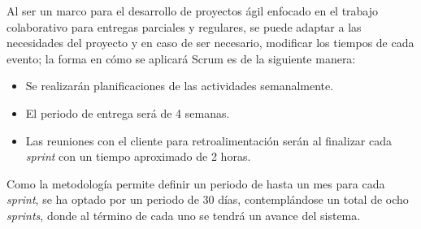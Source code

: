 Al ser un marco para el desarrollo de proyectos ágil enfocado en el trabajo colaborativo para entregas parciales y regulares, se puede adaptar a las necesidades del proyecto y en caso de ser necesario, modificar los tiempos de cada  evento; la forma en cómo se aplicará Scrum es de la siguiente manera:
\begin{itemize}
	\item Se realizarán planificaciones de las actividades semanalmente.
	\item El periodo de entrega será de 4 semanas.
	\item Las reuniones con el cliente para retroalimentación serán al finalizar cada \textit{sprint} con un tiempo aproximado de 2 horas.
\end{itemize}


Como la metodología permite definir un periodo de hasta un mes para cada \textit{sprint}, se ha optado por un periodo de 30 días, contemplándose un total de ocho \textit{sprints}, donde al término de cada uno se tendrá un avance del sistema.